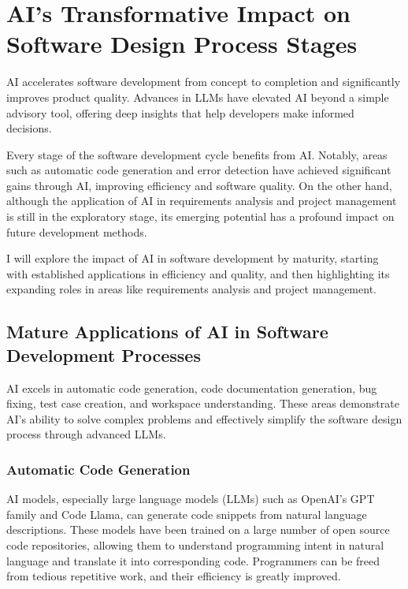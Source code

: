 \documentclass{article}
\begin{document}
\section{AI's Transformative Impact on Software Design Process Stages}

AI accelerates software development from concept to completion and significantly improves product quality. Advances in 
LLMs have elevated AI beyond a simple advisory tool, offering deep insights that help developers make informed decisions.\cite{crawford2023ai}

Every stage of the software development cycle benefits from AI. 
Notably, areas such as automatic code generation and error detection have achieved significant gains through AI, 
improving efficiency and software quality. On the other hand, although the application of AI in requirements 
analysis and project management is still in the exploratory stage, its emerging potential has a profound impact on future 
development methods.

I will explore the impact of AI in software development by maturity, starting with established applications in efficiency and quality, 
and then highlighting its expanding roles in areas like requirements analysis and project management.

\subsection{Mature Applications of AI in Software Development Processes}

AI excels in automatic code generation, code documentation generation, bug fixing, test case creation, and workspace understanding. 
These areas demonstrate AI’s ability to solve complex problems and effectively simplify the software design process through 
advanced LLMs.\cite{agarwal2024copilot}

\subsubsection{Automatic Code Generation}
AI models, especially large language models (LLMs) such as OpenAI's GPT family and Code Llama, can generate code snippets from 
natural language descriptions. These models have been trained on a large number of open source code repositories, allowing them 
to understand programming intent in natural language and translate it into corresponding code. Programmers can be freed from 
tedious repetitive work, and their efficiency is greatly improved.\cite{agarwal2024copilot}
\end{document}
